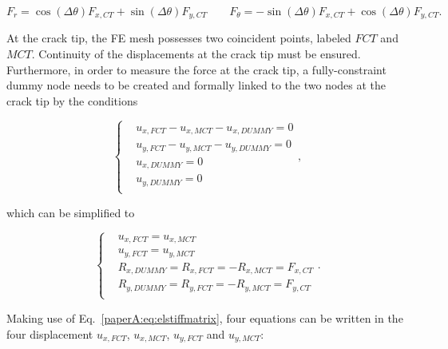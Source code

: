 \begin{equation}
F_{r}=\cos\left(\Delta\theta\right) F_{x,CT}+\sin\left(\Delta\theta\right) F_{y,CT}\qquad F_{\theta}=-\sin\left(\Delta\theta\right) F_{x,CT}+\cos\left(\Delta\theta\right) F_{y,CT}.
\end{equation}

At the crack tip, the FE mesh possesses two coincident points, labeled $FCT$ and $MCT$. Continuity of the displacements at the crack tip must be ensured. Furthermore, in order to measure the force at the crack tip, a fully-constraint dummy node needs to be created and formally linked to the two nodes at the crack tip by the conditions

\begin{equation}
\begin{cases}
&u_{x,FCT}-u_{x,MCT}-u_{x,DUMMY}=0\\
&u_{y,FCT}-u_{y,MCT}-u_{y,DUMMY}=0\\[10pt]
&u_{x,DUMMY}=0\\
&u_{y,DUMMY}=0\\
\end{cases},
\end{equation}

which can be simplified to

\begin{equation}
\begin{cases}
&u_{x,FCT}=u_{x,MCT}\\
&u_{y,FCT}=u_{y,MCT}\\[10pt]
&R_{x,DUMMY}=R_{x,FCT}=-R_{x,MCT}=F_{x,CT}\\
&R_{y,DUMMY}=R_{y,FCT}=-R_{y,MCT}=F_{y,CT}\\
\end{cases}.
\end{equation}

Making use of Eq.~\ref{paperA:eq:elstiffmatrix}, four equations can be written in the four displacement $u_{x,FCT}$, $u_{x,MCT}$, $u_{y,FCT}$ and $u_{y,MCT}$:

